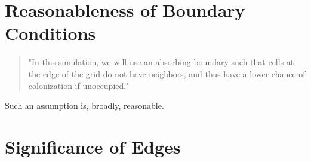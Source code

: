 \documentclass[titlepage]{scrartcl}
\begin{document}
\section{Reasonableness of Boundary Conditions}
\begin{quote}
	"In this simulation, we will use an absorbing boundary such that cells at the edge of	the grid do not have neighbors, and thus have a lower chance of colonization if	unoccupied."
\end{quote}
Such an assumption is, broadly, reasonable.  
\section{Significance of Edges}
\end{document}
